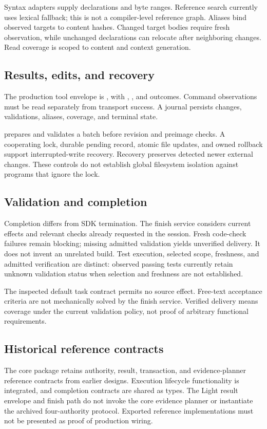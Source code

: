 \documentclass[11pt,a4paper]{article}
\newcommand{\code}[1]{\texttt{\detokenize{#1}}}
\begin{document}
Syntax adapters supply declarations and byte ranges. Reference search currently
uses lexical fallback; this is not a compiler-level reference graph.
Aliases bind observed targets to content hashes. Changed target bodies require
fresh observation, while unchanged declarations can relocate after neighboring
changes. Read coverage is scoped to content and context generation.

\subsection{Results, edits, and recovery}
The production tool envelope is \code{LightToolResult}, with
\code{ok}, \code{blocked}, and \code{failed} outcomes. Command observations
must be read separately from transport success. A journal persists changes,
validations, aliases, coverage, and terminal state.

\code{edit_code} prepares and validates a batch before revision and preimage
checks. A cooperating lock, durable pending record, atomic file updates, and
owned rollback support interrupted-write recovery. Recovery preserves detected
newer external changes. These controls do not establish global filesystem
isolation against programs that ignore the lock.

\subsection{Validation and completion}
Completion differs from SDK termination. The finish service considers current
effects and relevant checks already requested in the session. Fresh code-check
failures remain blocking; missing admitted validation yields unverified delivery.
It does not invent an unrelated build. Test execution, selected scope, freshness,
and admitted verification are distinct: observed passing tests currently retain
unknown validation status when selection and freshness are not established.

The inspected default task contract permits no source effect. Free-text
acceptance criteria are not mechanically solved by the finish service.
Verified delivery means coverage under the current validation policy, not
proof of arbitrary functional requirements.

\subsection{Historical reference contracts}
The core package retains authority, result, transaction, and evidence-planner
reference contracts from earlier designs. Execution lifecycle functionality
is integrated, and completion contracts are shared as types. The Light result
envelope and finish path do not invoke the core evidence planner or instantiate
the archived four-authority protocol. Exported reference implementations must
not be presented as proof of production wiring.
\end{document}
